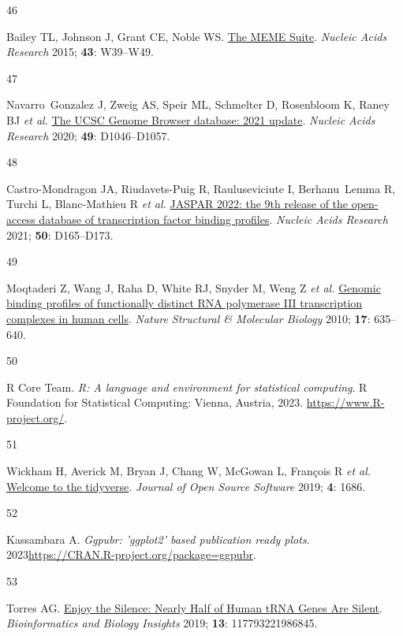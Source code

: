 \documentclass[
  12pt,
]{article}
\newlength{\cslhangindent}
\newlength{\csllabelwidth}
\newlength{\cslentryspacingunit} %
\newenvironment{CSLReferences}[2] %
 {%
  \setlength{\parindent}{0pt}
  \ifodd #1
  \let\oldpar\par
  \def\par{\hangindent=\cslhangindent\oldpar}
  \fi
  \setlength{\parskip}{#2\cslentryspacingunit}
 }%
 {}
\newcommand{\CSLLeftMargin}[1]{\parbox[t]{\csllabelwidth}{#1}}
\newcommand{\CSLRightInline}[1]{\parbox[t]{\linewidth - \csllabelwidth}{#1}\break}
\begin{document}
\begin{CSLReferences}{0}{0}
\leavevmode{}%
\CSLLeftMargin{46 }%
\CSLRightInline{Bailey TL, Johnson J, Grant CE, Noble WS. \href{https://doi.org/10.1093/nar/gkv416}{The MEME Suite}. \emph{Nucleic Acids Research} 2015; \textbf{43}: W39--W49.}

\leavevmode{}%
\CSLLeftMargin{47 }%
\CSLRightInline{Navarro~Gonzalez J, Zweig AS, Speir ML, Schmelter D, Rosenbloom K, Raney BJ \emph{et al.} \href{https://doi.org/10.1093/nar/gkaa1070}{The UCSC Genome Browser database: 2021 update}. \emph{Nucleic Acids Research} 2020; \textbf{49}: D1046--D1057.}

\leavevmode{}%
\CSLLeftMargin{48 }%
\CSLRightInline{Castro-Mondragon JA, Riudavets-Puig R, Rauluseviciute I, Berhanu~Lemma R, Turchi L, Blanc-Mathieu R \emph{et al.} \href{https://doi.org/10.1093/nar/gkab1113}{JASPAR 2022: the 9th release of the open-access database of transcription factor binding profiles}. \emph{Nucleic Acids Research} 2021; \textbf{50}: D165--D173.}

\leavevmode{}%
\CSLLeftMargin{49 }%
\CSLRightInline{Moqtaderi Z, Wang J, Raha D, White RJ, Snyder M, Weng Z \emph{et al.} \href{https://doi.org/10.1038/nsmb.1794}{Genomic binding profiles of functionally distinct RNA polymerase III transcription complexes in human cells}. \emph{Nature Structural \& Molecular Biology} 2010; \textbf{17}: 635--640.}

\leavevmode{}%
\CSLLeftMargin{50 }%
\CSLRightInline{R Core Team. \emph{R: A language and environment for statistical computing}. R Foundation for Statistical Computing: Vienna, Austria, 2023. \url{https://www.R-project.org/}.}

\leavevmode{}%
\CSLLeftMargin{51 }%
\CSLRightInline{Wickham H, Averick M, Bryan J, Chang W, McGowan L, François R \emph{et al.} \href{https://doi.org/10.21105/joss.01686}{Welcome to the tidyverse}. \emph{Journal of Open Source Software} 2019; \textbf{4}: 1686.}

\leavevmode{}%
\CSLLeftMargin{52 }%
\CSLRightInline{Kassambara A. \emph{Ggpubr: 'ggplot2' based publication ready plots}. 2023\url{https://CRAN.R-project.org/package=ggpubr}.}

\leavevmode{}%
\CSLLeftMargin{53 }%
\CSLRightInline{Torres AG. \href{https://doi.org/10.1177/1177932219868454}{Enjoy the Silence: Nearly Half of Human tRNA Genes Are Silent}. \emph{Bioinformatics and Biology Insights} 2019; \textbf{13}: 117793221986845.}


\end{CSLReferences}
\end{document}
